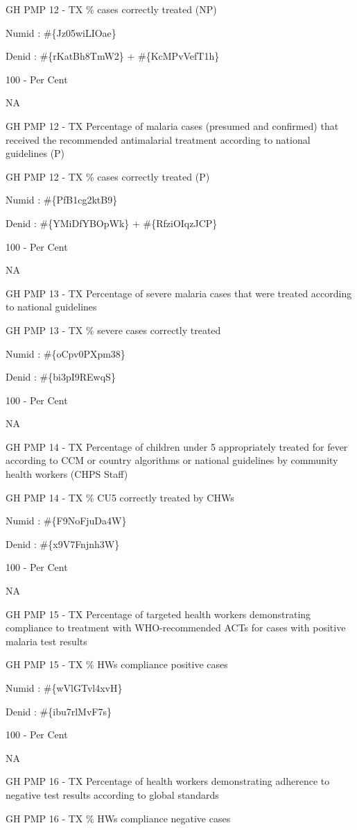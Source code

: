 \documentclass[]{book}
\begin{document}
GH PMP 12 - TX \% cases correctly treated (NP)

Numid : \#\{Jz05wiLIOae\}

Denid : \#\{rKatBh8TmW2\} + \#\{KcMPvVefT1h\}

100 - Per Cent

NA

GH PMP 12 - TX Percentage of malaria cases (presumed and confirmed) that received the recommended antimalarial treatment according to national guidelines (P)

GH PMP 12 - TX \% cases correctly treated (P)

Numid : \#\{PfB1cg2ktB9\}

Denid : \#\{YMiDfYBOpWk\} + \#\{RfziOIqzJCP\}

100 - Per Cent

NA

GH PMP 13 - TX Percentage of severe malaria cases that were treated according to national guidelines

GH PMP 13 - TX \% severe cases correctly treated

Numid : \#\{oCpv0PXpm38\}

Denid : \#\{bi3pI9REwqS\}

100 - Per Cent

NA

GH PMP 14 - TX Percentage of children under 5 appropriately treated for fever according to CCM or country algorithms or national guidelines by community health workers (CHPS Staff)

GH PMP 14 - TX \% CU5 correctly treated by CHWs

Numid : \#\{F9NoFjuDa4W\}

Denid : \#\{x9V7Fnjnh3W\}

100 - Per Cent

NA

GH PMP 15 - TX Percentage of targeted health workers demonstrating compliance to treatment with WHO-recommended ACTs for cases with positive malaria test results

GH PMP 15 - TX \% HWs compliance positive cases

Numid : \#\{wVlGTvl4xvH\}

Denid : \#\{ibu7rlMvF7s\}

100 - Per Cent

NA

GH PMP 16 - TX Percentage of health workers demonstrating adherence to negative test results according to global standards

GH PMP 16 - TX \% HWs compliance negative cases
\end{document}
